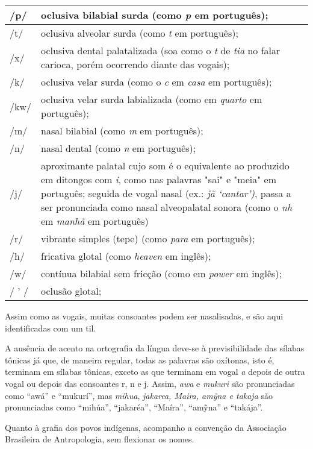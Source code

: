 \begin{longtable}[]{@{}ll@{}}
\toprule
/p/ & oclusiva bilabial surda (como \emph{p} em
português);\tabularnewline
\midrule
\endhead
/t/ & oclusiva alveolar surda (como \emph{t} em
português);\tabularnewline
/x/ & oclusiva dental palatalizada (soa como o \emph{t} de \emph{tia} no
falar carioca, porém ocorrendo diante das vogais);\tabularnewline
/k/ & oclusiva velar surda (como o \emph{c} em \emph{casa} em
português);\tabularnewline
/kw/ & oclusiva velar surda labializada (como em \emph{quarto} em
português);\tabularnewline
/m/ & nasal bilabial (como \emph{m} em português);\tabularnewline
/n/ & nasal dental (como \emph{n} em português);\tabularnewline
/j/ & aproximante palatal cujo som é o equivalente ao produzido em
ditongos com \emph{i}, como nas palavras "sai" e "meia" em português;
seguida de vogal nasal (ex.: \emph{jã `cantar')}, passa a ser
pronunciada como nasal alveopalatal sonora (como o \emph{nh} em
\emph{manhã} em português)\tabularnewline
/r/ & vibrante simples (tepe) (como \emph{para} em
português);\tabularnewline
/h/ & fricativa glotal (como \emph{heaven} em inglês);\tabularnewline
/w/ & contínua bilabial sem fricção (como em \emph{power} em
inglês);\tabularnewline
/ ' / & oclusão glotal;\tabularnewline
\bottomrule
\end{longtable}

Assim como as vogais, muitas consoantes podem ser nasalisadas, e são
aqui identificadas com um til.

A ausência de acento na ortografia da língua deve-se à previsibilidade
das sílabas tônicas já que, de maneira regular, todas as palavras são
oxítonas, isto é, terminam em sílabas tônicas, exceto as que terminam em
vogal \emph{a} depois de outra vogal ou depois das consoantes r, n e j.
Assim, \emph{awa} e \emph{mukuri} são pronunciadas como ``awá'' e
``mukurí'', mas \emph{mihua}, \emph{jakarea, Maira, amỹna e takaja} são
pronunciadas como ``mihúa'', ``jakaréa'', ``Maíra'', ``amỹna'' e
``takája''.

Quanto à grafia dos povos indígenas, acompanho a convenção da Associação
Brasileira de Antropologia, sem flexionar os nomes.
